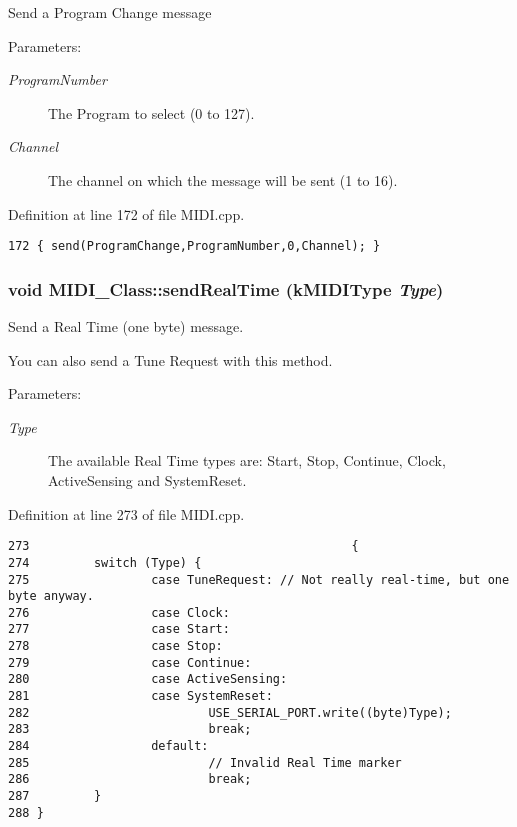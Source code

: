 Send a Program Change message \begin{Desc}
\item[Parameters:]
\begin{description}
\item[{\em ProgramNumber}]The Program to select (0 to 127). \item[{\em Channel}]The channel on which the message will be sent (1 to 16). \end{description}
\end{Desc}


Definition at line 172 of file MIDI.cpp.

\begin{Code}\begin{verbatim}172 { send(ProgramChange,ProgramNumber,0,Channel); }
\end{verbatim}
\end{Code}


\hypertarget{class_m_i_d_i___class_e9086dd31c41ea773925a069dbd0080b}{
\subsubsection[{sendRealTime}]{\setlength{\rightskip}{0pt plus 5cm}void MIDI\_\-Class::sendRealTime ({\bf kMIDIType} {\em Type})}}
\label{class_m_i_d_i___class_e9086dd31c41ea773925a069dbd0080b}


Send a Real Time (one byte) message. \par
 You can also send a Tune Request with this method. \begin{Desc}
\item[Parameters:]
\begin{description}
\item[{\em Type}]The available Real Time types are: Start, Stop, Continue, Clock, ActiveSensing and SystemReset. \end{description}
\end{Desc}


Definition at line 273 of file MIDI.cpp.

\begin{Code}\begin{verbatim}273                                             {
274         switch (Type) {
275                 case TuneRequest: // Not really real-time, but one byte anyway.
276                 case Clock:
277                 case Start:
278                 case Stop:      
279                 case Continue:
280                 case ActiveSensing:
281                 case SystemReset:
282                         USE_SERIAL_PORT.write((byte)Type);
283                         break;
284                 default:
285                         // Invalid Real Time marker
286                         break;
287         }
288 }
\end{verbatim}
\end{Code}



